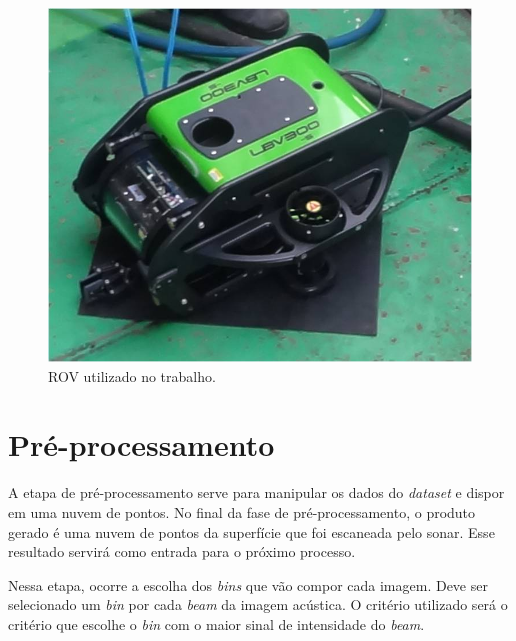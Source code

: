 \begin{figure}[H]
    \centering
    \includegraphics[scale=0.5]{dados/figuras/rov_furg.jpg}
    \caption{ROV utilizado no trabalho.}
    \label{fig:rov_nautec}
\end{figure}

\section{Pré-processamento}

A etapa de pré-processamento serve para manipular os dados do \textit{dataset} e dispor em uma nuvem de pontos.
No final da fase de pré-processamento, o produto gerado é uma nuvem de pontos da superfície que foi escaneada pelo sonar. Esse resultado servirá como entrada para o próximo processo.

Nessa etapa, ocorre a escolha dos \textit{bins} que vão compor cada imagem.
Deve ser selecionado um \textit{bin} por cada \textit{beam} da imagem acústica.
O critério utilizado será o critério que escolhe o \textit{bin} com o maior sinal de intensidade do \textit{beam}.

